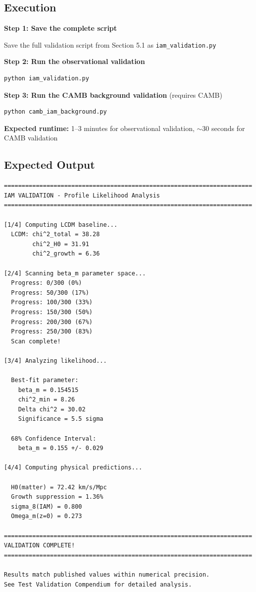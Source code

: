\documentclass[11pt]{article}
\begin{document}
\subsection{Execution}

\textbf{Step 1: Save the complete script}

Save the full validation script from Section 5.1 as \texttt{iam\_validation.py}

\textbf{Step 2: Run the observational validation}
\begin{lstlisting}[language=bash]
python iam_validation.py
\end{lstlisting}

\textbf{Step 3: Run the CAMB background validation} (requires CAMB)
\begin{lstlisting}[language=bash]
python camb_iam_background.py
\end{lstlisting}

\textbf{Expected runtime:} 1--3 minutes for observational validation, $\sim$30 seconds for CAMB validation

\subsection{Expected Output}

\begin{lstlisting}
======================================================================
IAM VALIDATION - Profile Likelihood Analysis
======================================================================

[1/4] Computing LCDM baseline...
  LCDM: chi^2_total = 38.28
        chi^2_H0 = 31.91
        chi^2_growth = 6.36

[2/4] Scanning beta_m parameter space...
  Progress: 0/300 (0%)
  Progress: 50/300 (17%)
  Progress: 100/300 (33%)
  Progress: 150/300 (50%)
  Progress: 200/300 (67%)
  Progress: 250/300 (83%)
  Scan complete!

[3/4] Analyzing likelihood...

  Best-fit parameter:
    beta_m = 0.154515
    chi^2_min = 8.26
    Delta chi^2 = 30.02
    Significance = 5.5 sigma

  68% Confidence Interval:
    beta_m = 0.155 +/- 0.029

[4/4] Computing physical predictions...

  H0(matter) = 72.42 km/s/Mpc
  Growth suppression = 1.36%
  sigma_8(IAM) = 0.800
  Omega_m(z=0) = 0.273

======================================================================
VALIDATION COMPLETE!
======================================================================

Results match published values within numerical precision.
See Test Validation Compendium for detailed analysis.
\end{lstlisting}
\end{document}
